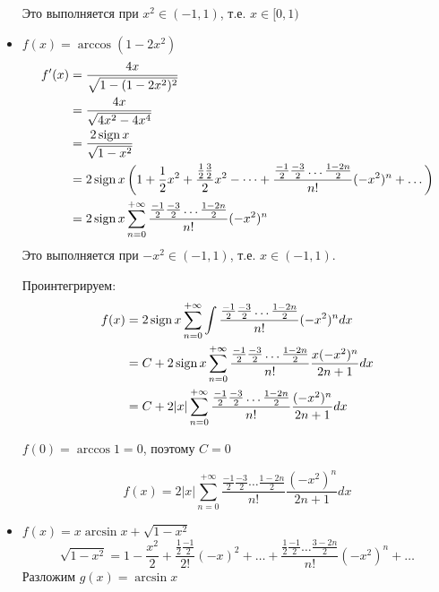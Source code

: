 \begin{exercise}[2873]
\begin{itemize}
              Это выполняется при \(x^2\in ( - 1, 1)\), т.е. \(x\in [0, 1)\)
        \item [(е)] \(f(x) = \arccos (1 - 2x^2)\)
              \begin{align*}
                  f'(x) & = \frac{4x}{\sqrt{1 - (1 - 2x^2)^2}}                                                                                                                                               \\
                        & = \frac{4x}{\sqrt{4x^2 - 4x^4}}                                                                                                                                                    \\
                        & = \frac{2\operatorname{\text{sign}} x}{\sqrt{1 - x^2}}                                                                                                                                                  \\
                        & = 2\operatorname{\text{sign}} x \left( 1 + \frac{1}{2}x^2 + \frac{\frac{1}{2} \frac{3}{2}}{2}x^2 - \dots + \frac{\frac{ - 1}{2} \frac{ - 3}{2} \dots \frac{1 - 2n}{2}}{n!} ( - x^2)^{n} + \dots \right) \\
                        & = 2\operatorname{\text{sign}} x \sum_{n = 0}^{+\infty} \frac{\frac{ - 1}{2} \frac{ - 3}{2} \dots \frac{1 - 2n}{2}}{n!} ( - x^2)^{n}                                                                     \\
              \end{align*}
              Это выполняется при \( - x^2 \in ( - 1, 1)\), т.е. \(x\in ( - 1, 1)\).

              Проинтегрируем:
              \begin{align*}
                  f(x) & = 2\operatorname{\text{sign}} x \sum_{n = 0}^{+\infty} \int \frac{\frac{ - 1}{2} \frac{ - 3}{2} \dots \frac{1 - 2n}{2}}{n!} ( - x^2)^{n} dx                \\
                       & = C + 2\operatorname{\text{sign}} x \sum_{n = 0}^{+\infty} \frac{\frac{ - 1}{2} \frac{ - 3}{2} \dots \frac{1 - 2n}{2}}{n!} \frac{x( - x^2)^{n}}{2n + 1} dx \\
                       & = C + 2|x| \sum_{n = 0}^{+\infty} \frac{\frac{ - 1}{2} \frac{ - 3}{2} \dots \frac{1 - 2n}{2}}{n!} \frac{( - x^2)^{n}}{2n + 1} dx      \\
              \end{align*}

              \(f(0) = \arccos 1 = 0\), поэтому \(C = 0\)

              \[f(x) = 2|x| \sum_{n = 0}^{+\infty} \frac{\frac{ - 1}{2} \frac{ - 3}{2} \dots \frac{1 - 2n}{2}}{n!} \frac{( - x^2)^{n}}{2n + 1} dx\]
        \item [(ж)] \(f(x) = x\arcsin x + \sqrt{1 - x^2}\)
              \[\sqrt{1 - x^2} = 1 - \frac{x^2}{2} + \frac{\frac{1}{2}\frac{ - 1}{2}}{2!} ( - x)^2 + \dots + \frac{\frac{1}{2}\frac{ -1}{2}\dots \frac{3 - 2n}{2}}{n!} ( -x^2)^n + \dots \]
              Разложим \(g(x) = \arcsin x\)


\end{itemize}
\end{exercise}
